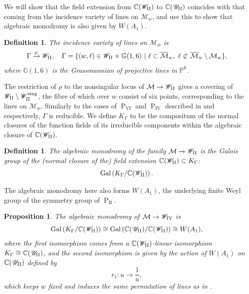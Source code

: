 \documentclass[a4paper,reqno]{amsart}
\numberwithin{equation}{section}
\newcommand{\C}{\mathbb{C}}
\newcommand{\p}{\mathbb{P}}
\newcommand{\pain}[1]{\operatorname{P}_{\mathrm{#1}}}
\newtheorem{definition}[theorem]{Definition}
\newtheorem{proposition}[theorem]{Proposition}
\numberwithin{equation}{section}
\begin{document}
We will show that the field extension from $\C(\mathscr{W}_{\rm{II}})$ to $\C(\mathscr{U}_{\rm{II}})$ coincides with that coming from the incidence variety of lines on $\mathcal{M}_w$, and use this to show that algebraic monodromy is also given by $W(A_1)$.

\begin{definition}
    The incidence variety of lines on $\mathcal{M}_w$ is 
    \begin{equation*}
        \Gamma\xrightarrow{\rho} \mathscr{W}_{\rm{II}}, \quad\Gamma = \{ (w,\ell)\in \mathscr{W}_{\rm{II}} \times \mathbb{G}(1,6)~|~\ell \subset \overline{\mathcal{M}}_w, \,\, \ell \not\subset \overline{\mathcal{M}}_w\setminus \mathcal{M}_w\},
    \end{equation*}
    where $\mathbb{G}(1,6)$ is the Grassmannian of projective lines in $\p^6$.
\end{definition}

The restriction of $\rho$ to the nonsingular locus of $\mathcal{M}\to\mathscr{W}_{\rm{II}}$ gives a covering of $\mathscr{W}_{\rm{II}}\setminus \mathscr{W}_{\rm{II}}^{\operatorname{sing}}$, the fibre of which over $w$ consist of six points, corresponding to the lines on $\mathcal{M}_w$.
Similarly to the cases of $\pain{VI}$ and $\pain{IV}$ described in  and  respectively, $\Gamma$ is reducible. 
We define $K_{\Gamma}$ to be the compositum of the normal closures of the function fields of its irreducible components within the algebraic closure of $\C(\mathscr{W}_{\rm{II}})$. 

\begin{definition}
    The \emph{algebraic monodromy} of the family $\mathcal{M}\to \mathscr{W}_{\rm{II}}$ is the Galois group of the (normal closure of the) field extension $\C(\mathscr{W}_{\rm{II}})\subset K_{\Gamma}$:
    \begin{equation*}
        \operatorname{Gal}\left( K_{\Gamma}/ \C(\mathscr{W}_{\rm{II}})\right).
    \end{equation*}
\end{definition}
The algebraic monodromy here also forms $W(A_1)$, the underlying finite Weyl group of the symmetry group of $\pain{II}$.

\begin{proposition}  \label{prop:algebraicmonodromyPII}
    The algebraic monodromy of $\mathcal{M}\to \mathscr{W}_{\rm{IV}}$ is 
    $$\operatorname{Gal}\left( K_{\Gamma}/ \C(\mathscr{W}_{\rm{II}})\right) \cong \operatorname{Gal}\left( \C(\mathscr{U}_{\rm{II}})/ \C(\mathscr{W}_{\rm{II}})\right) \cong W(A_1),$$
    where the first isomorphism comes from a $\C(\mathscr{W}_{\rm{II}})$-linear isomorphism $K_{\Gamma}\cong \C(\mathscr{U}_{\rm{II}})$, and the second isomorphism is given by the action of $W(A_1)$ on $\C(\mathscr{U}_{\rm{II}})$ defined by 
    \begin{equation*}
    r_1 : u\to \frac{1}{u},
    \end{equation*}
    which keeps $w$ fixed and induces the same permutation of lines as in .
\end{proposition}
\end{document}
